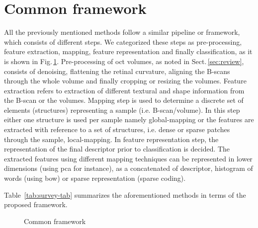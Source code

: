 \section{Common framework}
All the previously mentioned methods follow a similar pipeline or framework, which consists of different steps. 
We categorized these steps as pre-processing, feature extraction, mapping, feature representation and finally classification, as it is shown in Fig.\,\ref{fig:ML-scheme}.
{\color{blue}Pre-processing of \gls{oct} volumes, as noted in Sect.\,\ref{sec:review}, consists of denoising, flattening the retinal curvature, aligning the B-scans through the whole volume and finally cropping or resizing the volumes.
Feature extraction refers to extraction of different textural and shape information from the B-scan or the volumes. 
Mapping step is used to determine a discrete set of elements (structures) representing a sample (i.e. B-scan/volume).
In this step either one structure is used per sample namely global-mapping or the features are extracted with reference to a set of structures, i.e. dense or sparse patches through the sample, local-mapping. 
In feature representation step, the representation of the final descriptor prior to classification is decided.
The extracted features using different mapping techniques can be represented in lower dimensions (using \gls{pca} for instance), as a concatenated of descriptor, histogram of words (using \gls{bow}) or sparse representation (sparse coding).}

Table~\ref{tab:survey-tab} summarizes the aforementioned methods in terms of the proposed framework.
\begin{figure}
    \caption{Common framework}
  \label{fig:ML-scheme}
\end{figure}



\section{}\label{sec:method}\label{sec:exp}

